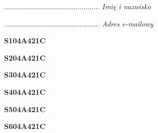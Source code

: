 \begin{turn}{90}\begin{minipage}{\linewidth} \vspace{20mm} ................................................  \textit{Imię i nazwisko}\end{minipage}\end{turn}

\begin{turn}{90}\begin{minipage}{\linewidth} \vspace{20mm} ................................................  \textit{Adres e-mailowy}\end{minipage}\end{turn}

\begin{turn}{90}\huge \begin{minipage}{\linewidth} \vspace{10mm}\textbf{S104A421C}\end{minipage}\end{turn}

\begin{turn}{90}\huge \begin{minipage}{\linewidth} \vspace{10mm}\textbf{S204A421C}\end{minipage}\end{turn}

\begin{turn}{90}\huge \begin{minipage}{\linewidth} \vspace{10mm}\textbf{S304A421C}\end{minipage}\end{turn}

\begin{turn}{90}\huge \begin{minipage}{\linewidth} \vspace{10mm}\textbf{S404A421C}\end{minipage}\end{turn}

\begin{turn}{90}\huge \begin{minipage}{\linewidth} \vspace{10mm}\textbf{S504A421C}\end{minipage}\end{turn}

\begin{turn}{90}\huge \begin{minipage}{\linewidth} \vspace{10mm}\textbf{S604A421C}\end{minipage}\end{turn}

